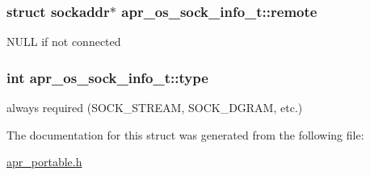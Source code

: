 \subsubsection[{\texorpdfstring{remote}{remote}}]{\setlength{\rightskip}{0pt plus 5cm}struct sockaddr$\ast$ apr\+\_\+os\+\_\+sock\+\_\+info\+\_\+t\+::remote}\hypertarget{structapr__os__sock__info__t_ae71fe14a5eb9141fc4ad0a6d0a91f17e}{}\label{structapr__os__sock__info__t_ae71fe14a5eb9141fc4ad0a6d0a91f17e}
N\+U\+LL if not connected 
\subsubsection[{\texorpdfstring{type}{type}}]{\setlength{\rightskip}{0pt plus 5cm}int apr\+\_\+os\+\_\+sock\+\_\+info\+\_\+t\+::type}\hypertarget{structapr__os__sock__info__t_a248fb394cd644b31619f44de0936aa04}{}\label{structapr__os__sock__info__t_a248fb394cd644b31619f44de0936aa04}
always required (S\+O\+C\+K\+\_\+\+S\+T\+R\+E\+AM, S\+O\+C\+K\+\_\+\+D\+G\+R\+AM, etc.) 

The documentation for this struct was generated from the following file\+:\begin{DoxyCompactItemize}
\item 
\hyperlink{apr__portable_8h}{apr\+\_\+portable.\+h}\end{DoxyCompactItemize}
